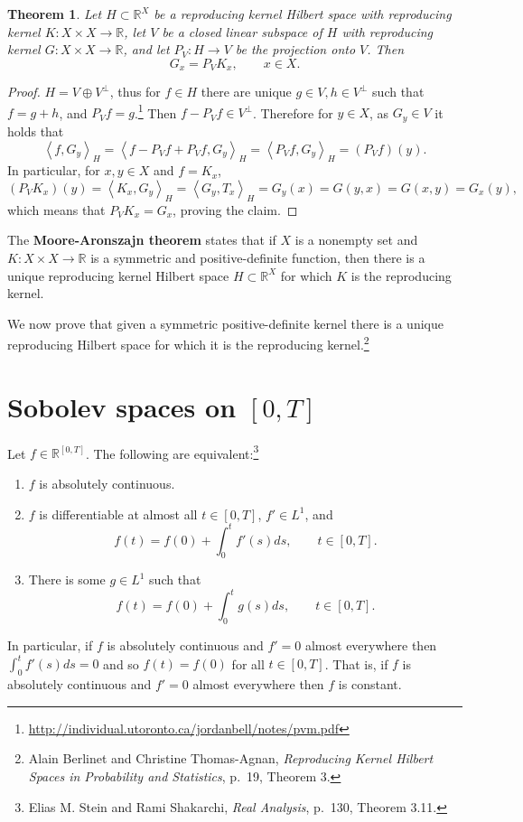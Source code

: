 \documentclass{article}
\newcommand{\inner}[2]{\left\langle #1, #2 \right\rangle}
\newtheorem{theorem}{Theorem}
\theoremstyle{definition}
\begin{document}
\begin{theorem}
Let $H \subset \mathbb{R}^X$ be a reproducing kernel Hilbert space
with reproducing kernel $K:X \times X \to \mathbb{R}$, let
$V$ be a closed linear subspace of $H$ with reproducing kernel
$G:X \times X \to \mathbb{R}$, and let $P_V:H \to V$ be the projection onto $V$. 
Then
\[
G_x = P_V K_x,\qquad x \in X.
\]
\end{theorem}
\begin{proof}
$H=V \oplus V^\perp$, thus for $f \in H$ there are unique $g \in V, h \in V^\perp$ such that $f=g+h$, and
$P_V f = g$.\footnote{\url{http://individual.utoronto.ca/jordanbell/notes/pvm.pdf}} Then $f-P_V f \in V^\perp$. 
Therefore for $y \in X$, as $G_y \in V$ it holds that
\[
\inner{f}{G_y}_H = \inner{f-P_Vf + P_Vf}{G_y}_H = 
\inner{P_Vf}{G_y}_H = (P_V f)(y).
\]
In particular, for  $x,y \in X$ and $f=K_x$,
\[
(P_V K_x)(y) = \inner{K_x}{G_y}_H = \inner{G_y}{T_x}_H = G_y(x) = G(y,x) = G(x,y)=G_x(y),
\]
which means that $P_V K_x=G_x$, proving the claim.
\end{proof}



The \textbf{Moore-Aronszajn theorem} states that if
 $X$ is a nonempty set and  $K:X \times X \to \mathbb{R}$ is a symmetric and positive-definite function, then 
 there is a unique reproducing
kernel Hilbert space $H \subset \mathbb{R}^X$ for which $K$ is the reproducing kernel.

We now prove that given a symmetric positive-definite kernel there is a unique reproducing Hilbert space for which it is
the reproducing kernel.\footnote{Alain Berlinet and Christine Thomas-Agnan, {\em Reproducing Kernel Hilbert Spaces
in Probability and Statistics}, p.~19, Theorem 3.}





\section{Sobolev spaces on $[0,T]$}
Let $f \in \mathbb{R}^{[0,T]}$. The following are equivalent:\footnote{Elias M. Stein and Rami Shakarchi,
{\em Real Analysis}, p.~130, Theorem 3.11.}
\begin{enumerate}
\item $f$ is absolutely continuous.
\item $f$ is differentiable at almost all $t \in [0,T]$, $f' \in L^1$, and 
\[
f(t)=f(0)+\int_0^t f'(s) ds,\qquad t \in [0,T].
\]
\item There is some $g \in L^1$ such that
\[
f(t) = f(0) + \int_0^t g(s) ds,\qquad t \in [0,T].
\]
\end{enumerate}
In particular, if $f$ is absolutely continuous and $f'=0$ almost everywhere
 then $\int_0^t f'(s) ds = 0$  and so $f(t)=f(0)$ for
all $t \in [0,T]$. That is, if $f$ is absolutely continuous and $f'=0$ almost everywhere then
$f$ is constant. 
\end{document}

